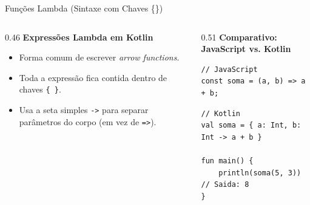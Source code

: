 \documentclass[aspectratio=169]{beamer}
\begin{document}
\begin{frame}[fragile]{Funções Lambda (Sintaxe com Chaves \{\})}
  \begin{columns}[T]
    \begin{column}{0.46\textwidth}
      \textbf{Expressões Lambda em Kotlin}
      \vspace{0.3em}
      \begin{itemize}\small
        \item Forma comum de escrever \textit{arrow functions}.
        \item Toda a expressão fica contida dentro de chaves \texttt{\{ \}}.
        \item Usa a seta simples \texttt{->} para separar parâmetros do corpo (em vez de \texttt{=>}).
      \end{itemize}
    \end{column}
    \begin{column}{0.51\textwidth}
      \textbf{Comparativo: JavaScript vs. Kotlin}
      \vspace{0.2em}
\begin{lstlisting}[style=JavaStyle]
// JavaScript
const soma = (a, b) => a + b;
\end{lstlisting}

\begin{lstlisting}[style=KotlinStyle]
// Kotlin
val soma = { a: Int, b: Int -> a + b }

fun main() {
    println(soma(5, 3)) // Saida: 8
}
\end{lstlisting}
    \end{column}
  \end{columns}
\end{frame}
\end{document}
